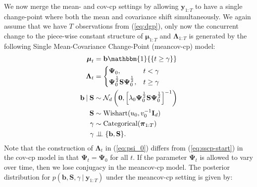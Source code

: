 We now merge the mean- and cov-cp settings by allowing $\mathbf{y}_{1:T}$ to have a single change-point where both the mean and covariance shift simultaneously. We again assume that we have $T$ observations from (\ref{eq:dgp}), only now the concurrent change to the piece-wise constant structure of $\boldsymbol{\mu}_{1:T}$ and $\boldsymbol{\Lambda}_{1:T}$ is generated by the following Single Mean-Covariance Change-Point (meancov-cp) model:
\begin{align}
    \label{eq:smscp-start}
    \boldsymbol{\mu}_t &= \mathbf{b}\mathbbm{1}{\left\{t\geq \gamma \right\}} \\
    \boldsymbol{\Lambda}_t &= 
    \begin{cases}
        \boldsymbol{\Psi}_{0}, & t < \gamma  \\
        \boldsymbol{\Psi}^\frac{1} {2}_{0}\mathbf{S}\boldsymbol{\Psi}^\frac{1}{2}_{0}, & t \geq \gamma
    \end{cases} \label{eq:psi_0}
    \\
    \mathbf{b} \:|\: \mathbf{S} &\sim \mathcal{N}_d\left(\mathbf{0},\left[\lambda_0\boldsymbol{\Psi}^\frac{1}{2}_{0}\mathbf{S}\boldsymbol{\Psi}^\frac{1}{2}_{0}\right]^{-1}\right) \\
    \mathbf{S} &\sim \text{Wishart}(u_0, v_0^{-1}\mathbf{I}_d) \\    
    \gamma &\sim \text{Categorical}(\boldsymbol{\pi}_{1:T}) \\
    \gamma &\indep \{\mathbf{b},\mathbf{S}\}. 
    \label{eq:smscp-end}
\end{align}
Note that the construction of $\boldsymbol{\Lambda}_t$ in (\ref{eq:psi_0}) differs from (\ref{eq:sscp-start}) in the cov-cp model in that $\boldsymbol{\Psi}_t = \boldsymbol{\Psi}_0$ for all $t$. If the parameter $\boldsymbol{\Psi}_t$ is allowed to vary over time, then we lose conjugacy in the meancov-cp model. The posterior distribution for $p(\mathbf{b}, \mathbf{S}, \gamma \:|\: \mathbf{y}_{1:T})$ under the meancov-cp setting is given by:
